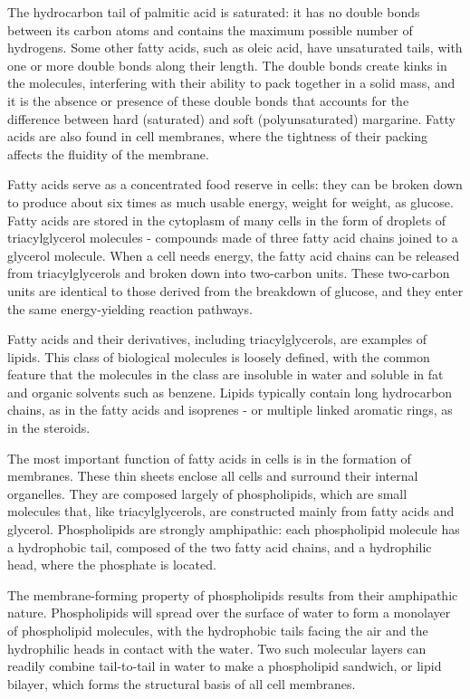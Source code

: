 The hydrocarbon tail of palmitic acid is saturated: it has no double bonds
between its carbon atoms and contains the maximum possible number
of hydrogens. Some other fatty acids, such as oleic acid, have
unsaturated tails, with one or more double bonds along their length. The
double bonds create kinks in the molecules, interfering with their ability
to pack together in a solid mass, and it is the absence or presence of
these double bonds that accounts for the difference between hard (saturated)
and soft (polyunsaturated) margarine. Fatty acids are also found in
cell membranes, where the tightness of their packing affects the fluidity
of the membrane.

Fatty acids serve as a concentrated food reserve in cells: they can be
broken down to produce about six times as much usable energy, weight
for weight, as glucose. Fatty acids are stored in the cytoplasm of many cells
in the form of droplets of triacylglycerol molecules - compounds made of
three fatty acid chains joined to a glycerol molecule. When a cell needs
energy, the fatty acid chains can be released from triacylglycerols and
broken down into two-carbon units. These two-carbon units are identical
to those derived from the breakdown of glucose, and they enter the same
energy-yielding reaction pathways.

Fatty acids and their derivatives, including triacylglycerols, are examples
of lipids. This class of biological molecules is loosely defined, with the
common feature that the molecules in the class are insoluble in water and
soluble in fat and organic solvents such as benzene. Lipids typically contain
long hydrocarbon chains, as in the fatty acids and isoprenes - or multiple
linked aromatic rings, as in the steroids.

The most important function of fatty acids in cells is in the formation of
membranes. These thin sheets enclose all cells and surround their internal
organelles. They are composed largely of phospholipids, which are small
molecules that, like triacylglycerols, are constructed mainly from fatty
acids and glycerol. Phospholipids are strongly amphipathic: each phospholipid
molecule has a hydrophobic tail, composed of the two fatty acid chains,
and a hydrophilic head, where the phosphate is located.

The membrane-forming property of phospholipids results from their
amphipathic nature. Phospholipids will spread over the surface of water to
form a monolayer of phospholipid molecules, with the hydrophobic tails
facing the air and the hydrophilic heads in contact with the water. Two
such molecular layers can readily combine tail-to-tail in water to make a
phospholipid sandwich, or lipid bilayer, which forms the structural basis
of all cell membranes.

